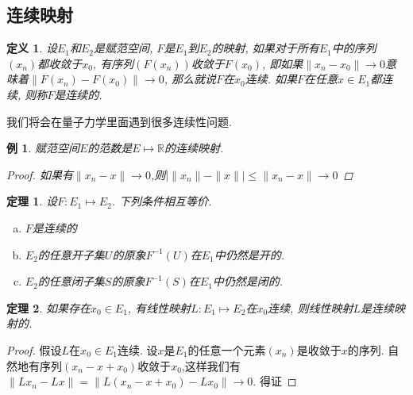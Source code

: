 \documentclass[a4paper,11pt]{book}
\newtheorem{definition}{\hspace{2em}定义}[section]
\newtheorem{theorem}{\hspace{2em}定理}[section]
\newtheorem{proof}{证明}[section]
\newtheorem{example}{例}[section]
\begin{document}
\subsection*{连续映射}
\begin{definition}
  设$E_1$和$E_2$是赋范空间, $F$是$E_1$到$E_2$的映射, 如果对于所有$E_1$中的序列$(x_n)$都收敛于$x_0$, 有序列$(F(x_n))$收敛于$F(x_0)$, 即如果$\|x_n-x_0\|\to0$意味着$\|F(x_n)-F(x_0)\|\to0$, 那么就说$F$在$x_0$连续. 如果$F$在任意$x\in E_1$都连续, 则称$F$是连续的.
\end{definition}
我们将会在量子力学里面遇到很多连续性问题.
\begin{example}
  赋范空间$E$的范数是$E\mapsto\mathbb{R}$的连续映射.
  \begin{proof}
    如果有$\|x_n-x\|\to0$,则$|\|x_n\|-\|x\||\leq\|x_n-x\|\to 0$
  \end{proof}
\end{example}
\begin{theorem}
  设$F:E_1\mapsto E_2$. 下列条件相互等价.
  \begin{enumerate}[(a)]
    \item $F$是连续的
    \item $E_2$的任意开子集$U$的原象$F^{-1}(U)$在$E_1$中仍然是开的.
    \item $E_2$的任意闭子集$S$的原象$F^{-1}(S)$在$E_1$中仍然是闭的.
  \end{enumerate}
\end{theorem}
\begin{theorem}\label{continuous linear map}
  如果存在$x_0\in E_1$, 有线性映射$L:E_1\mapsto E_2$在$x_0$连续, 则线性映射$L$是连续映射的.
\end{theorem}
\begin{proof}
  假设$L$在$x_0\in E_1$连续. 设$x$是$E_1$的任意一个元素$(x_n)$是收敛于$x$的序列. 自然地有序列$(x_n-x+x_0)$收敛于$x_0$,这样我们有$\|Lx_n-Lx\|=\|L(x_n-x+x_0)-Lx_0\|\to 0$. 得证
\end{proof}
\end{document}

